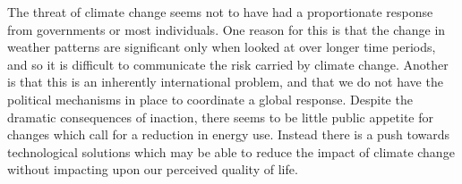The threat of climate change seems not to have had a proportionate response from governments or most individuals. One reason for this is that the change in weather patterns are significant only when looked at over longer time periods, and so it is difficult to communicate the risk carried by climate change. Another is that this is an inherently international problem, and that we do not have the political mechanisms in place to coordinate a global response. Despite the dramatic consequences of inaction, there seems to be little public appetite for changes which call for a reduction in energy use. Instead there is a push towards technological solutions which may be able to reduce the impact of climate change without impacting upon our perceived quality of life.






